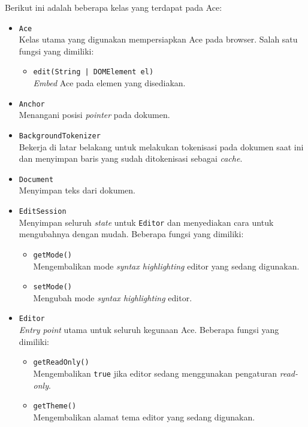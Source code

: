 Berikut ini adalah beberapa kelas yang terdapat pada Ace:

\begin{itemize}
    \item \verb|Ace| \\ Kelas utama yang digunakan mempersiapkan Ace pada browser. Salah satu fungsi yang dimiliki:
        \begin{itemize}
            \item \texttt{edit(String | DOMElement el)} \\ \textit{Embed} Ace pada elemen yang disediakan.
        \end{itemize}
    \item \verb|Anchor| \\ Menangani posisi \textit{pointer} pada dokumen.
    \item \verb|BackgroundTokenizer| \\ Bekerja di latar belakang untuk melakukan tokenisasi pada dokumen saat ini dan menyimpan baris yang sudah ditokenisasi sebagai \textit{cache}.
    \item \verb|Document| \\ Menyimpan teks dari dokumen. 
    \item \verb|EditSession| \\ Menyimpan seluruh \textit{state} untuk \verb|Editor| dan menyediakan cara untuk mengubahnya dengan mudah. Beberapa fungsi yang dimiliki:
        \begin{itemize}
            \item \verb|getMode()| \\ Mengembalikan mode \textit{syntax highlighting} editor yang sedang digunakan.
            \item \verb|setMode()| \\ Mengubah mode \textit{syntax highlighting} editor.
        \end{itemize}
    \item \verb|Editor| \\ \textit{Entry point} utama untuk seluruh kegunaan Ace. Beberapa fungsi yang dimiliki:
        \begin{itemize}
            \item \verb|getReadOnly()| \\ Mengembalikan \verb|true| jika editor sedang menggunakan pengaturan \textit{read-only}.
            \item \verb|getTheme()| \\ Mengembalikan alamat tema editor yang sedang digunakan.

\end{itemize}
\end{itemize}
